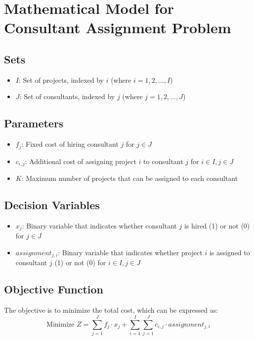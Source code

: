 \documentclass{article}
\begin{document}
\section*{Mathematical Model for Consultant Assignment Problem}

\subsection*{Sets}
\begin{itemize}
    \item \( I \): Set of projects, indexed by \( i \) (where \( i = 1, 2, \ldots, I \))
    \item \( J \): Set of consultants, indexed by \( j \) (where \( j = 1, 2, \ldots, J \))
\end{itemize}

\subsection*{Parameters}
\begin{itemize}
    \item \( f_j \): Fixed cost of hiring consultant \( j \) for \( j \in J \)
    \item \( c_{i,j} \): Additional cost of assigning project \( i \) to consultant \( j \) for \( i \in I, j \in J \)
    \item \( K \): Maximum number of projects that can be assigned to each consultant
\end{itemize}

\subsection*{Decision Variables}
\begin{itemize}
    \item \( x_{j} \): Binary variable that indicates whether consultant \( j \) is hired (1) or not (0) for \( j \in J \)
    \item \( assignment_{j,i} \): Binary variable that indicates whether project \( i \) is assigned to consultant \( j \) (1) or not (0) for \( i \in I, j \in J \)
\end{itemize}

\subsection*{Objective Function}
The objective is to minimize the total cost, which can be expressed as:
\[
\text{Minimize } Z = \sum_{j=1}^{J} f_j \cdot x_j + \sum_{i=1}^{I} \sum_{j=1}^{J} c_{i,j} \cdot assignment_{j,i}
\]
\end{document}
